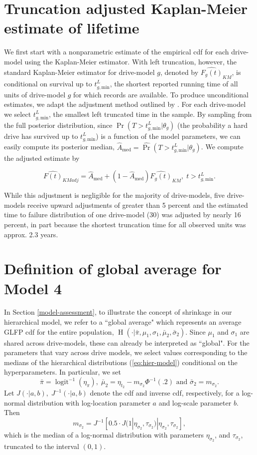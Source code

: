 \documentclass[12pt]{article}
\newcommand{\op}{\operatorname}
\begin{document}
\appendix
\section{Truncation adjusted Kaplan-Meier estimate of lifetime}
\label{sec:trunc-adj}
We first start with a nonparametric estimate of the empirical cdf for each drive-model using the Kaplan-Meier estimator.  With left truncation, however, the standard Kaplan-Meier estimator for drive-model $g$, denoted by
$\widehat{F_g(t)}_{KM}$, is conditional on survival up to
$t_{g,\text{min}}^L$, the shortest reported running time of all units
of drive-model $g$ for which records are available. To produce
unconditional estimates, we adapt the adjustment method outlined by \citet[Chapter 11]{meeker}.  For each drive-model we select
$t_{g,\text{min}}^L$, the smallest left truncated time in the sample.
By sampling from the full posterior distribution, since
$\Pr(T>t_{g,\text{min}}^L|\theta_g)$ (the probability a hard drive has
survived up to $t_{g,\text{min}}^L$) is a function of the model
parameters, we can easily compute its posterior median,
$\widehat{A}_{\text{med}} = \widehat{\Pr}(T>t_{g,\text{min}}^L|\theta_g)$. We compute the adjusted estimate by

$$\widehat{F(t)}_{KMadj} = \widehat{A}_{\text{med}} + \left(1 - \widehat{A}_{\text{med}}\right)\widehat{F_g(t)}_{KM},\; t>t_{g,\text{min}}^L.$$

While this adjustment is negligible for the majority of drive-models, five drive-models receive upward adjustments of greater than 5 percent and the estimated time to failure distribution of one drive-model (30) was adjusted by nearly 16 percent, in part because the shortest truncation time for all observed units was approx. 2.3 years.

\section{Definition of global average for Model 4}
\label{global-avg}
In Section \ref{model-assessment}, to illustrate the concept of shrinkage in our hierarchical model, we refer to a ``global average" which represents an average GLFP cdf for the entire population, $\op{H}\left(\cdot|\bar{\pi},\mu_1,\sigma_1,\bar{\mu}_2,\bar{\sigma}_2\right)$. Since $\mu_1$ and $\sigma_1$ are shared across drive-models, these can already be interpreted as ``global". For the parameters that vary across drive models, we select values corresponding to the medians of the hierarchical distributions (\ref{eq:hier-model}) conditional on the hyperparameters. In particular, we set
$$\bar{\pi}=\op{logit}^{-1}(\eta_{\pi}),\;\bar{\mu}_2=\eta_{t_2} - m_{\sigma_2}\Phi^{-1}(.2) \mbox{ and } \bar{\sigma}_2= m_{\sigma_2}.$$
Let $J(\cdot|a,b),\;J^{-1}(\cdot|a,b)$ denote the cdf and inverse cdf, respectively, for a log-normal distribution with log-location parameter $a$ and log-scale parameter $b$. Then
$$m_{\sigma_2}=J^{-1}[0.5 \cdot J(1|\eta_{\sigma_2},\tau_{\sigma_2})|\eta_{\sigma_2}, \tau_{\sigma_2}],$$
which is the median of a log-normal distribution with parameters $\eta_{\sigma_2}$, and $\tau_{\sigma_2}$, truncated to the interval $(0, 1)$.
\end{document}
